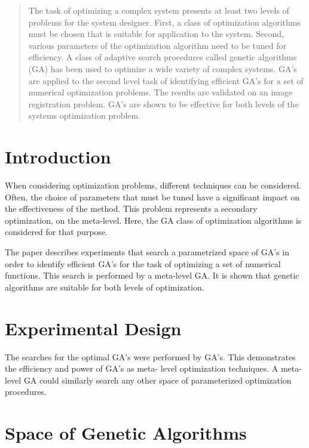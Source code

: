 \documentclass[../main.tex]{subfiles}
\begin{document}
\begin{abstract}
The task of optimizing a complex system presents at least two levels of problems for the system designer. First, a
class of optimization algorithms must be chosen that is suitable for application to the system. Second, various
parameters of the optimization algorithm need to be tuned for efficiency. A class of adaptive search procedures called
genetic algorithms (GA) has been used to optimize a wide variety of complex systems. GA's are applied to the second
level task of identifying efficient GA's for a set of numerical optimization problems. The results are validated on an
image registration problem. GA's are shown to be effective for both levels of the systems optimization problem.
\end{abstract}

\begin{mdframed}
\end{mdframed}

\section{Introduction}

When considering optimization problems, different techniques can be considered. Often, the choice of parameters that
must be tuned have a significant impact on the effectiveness of the method. This problem represents a secondary
optimization, on the meta-level. Here, the GA class of optimization algorithms is considered for that purpose.

The paper describes experiments that search a parametrized space of GA's in order to identify efficient GA's for the
task of optimizing a set of numerical functions. This search is performed by a meta-level GA. It is shown that genetic
algorithms are suitable for both levels of optimization.

\section{Experimental Design}
The searches for the optimal GA's were performed by GA's. This demonstrates the efficiency and power of GA's as meta-
level optimization techniques. A meta-level GA could similarly search any other space of parameterized optimization
procedures.

\section{Space of Genetic Algorithms}
\end{document}
